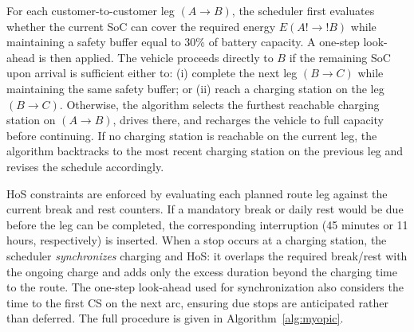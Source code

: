 \documentclass[3p,11pt,authoryear]{elsarticle}  %
\begin{document}
For each customer-to-customer leg $(A \rightarrow B)$, the scheduler first evaluates whether the current SoC can cover the required energy $E(A!\rightarrow!B)$ while maintaining a safety buffer equal to 30\% of battery capacity. A one-step look-ahead is then applied. The vehicle proceeds directly to $B$ if the remaining SoC upon arrival is sufficient either to: (i) complete the next leg $(B \rightarrow C)$ while maintaining the same safety buffer; or (ii) reach a charging station on the leg $(B \rightarrow C)$. Otherwise, the algorithm selects the furthest reachable charging station on $(A \rightarrow B)$, drives there, and recharges the vehicle to full capacity before continuing. If no charging station is reachable on the current leg, the algorithm backtracks to the most recent charging station on the previous leg and revises the schedule accordingly.

HoS constraints are enforced by evaluating each planned route leg against the current break and rest counters. If a mandatory break or daily rest would be due before the leg can be completed, the corresponding interruption (45 minutes or 11 hours, respectively) is inserted. When a stop occurs at a charging station, the scheduler \emph{synchronizes} charging and HoS: it overlaps the required break/rest with the ongoing charge and adds only the excess duration beyond the charging time to the route. The one-step look-ahead used for synchronization also considers the time to the first CS on the next arc, ensuring due stops are anticipated rather than deferred. %
The full procedure is given in Algorithm~\ref{alg:myopic}.
\end{document}
